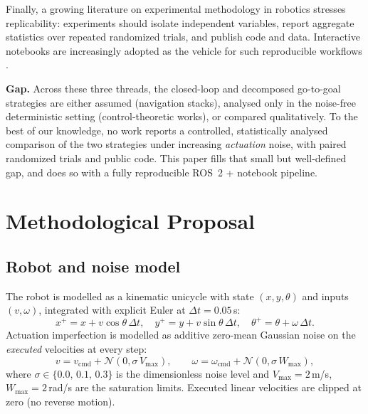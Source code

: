 \documentclass[conference]{IEEEtran}
\begin{document}
Finally, a growing literature on experimental methodology in robotics
\cite{bonsignorio2015toward,macenski2022ros2} stresses replicability:
experiments should isolate independent variables, report aggregate statistics
over repeated randomized trials, and publish code and data. Interactive
notebooks are increasingly adopted as the vehicle for such reproducible
workflows \cite{kluyver2016jupyter}.

\textbf{Gap.} Across these three threads, the closed-loop and decomposed
go-to-goal strategies are either assumed (navigation stacks), analysed only
in the noise-free deterministic setting (control-theoretic works), or
compared qualitatively. To the best of our knowledge, no work reports a
controlled, statistically analysed comparison of the two strategies under
increasing \emph{actuation} noise, with paired randomized trials and public
code. This paper fills that small but well-defined gap, and does so with a
fully reproducible ROS~2 + notebook pipeline.

\section{Methodological Proposal}
\subsection{Robot and noise model}
The robot is modelled as a kinematic unicycle with state $(x,y,\theta)$ and
inputs $(v,\omega)$, integrated with explicit Euler at $\Delta t=0.05$\,s:
\begin{equation}
x^+ = x + v\cos\theta\,\Delta t,\quad
y^+ = y + v\sin\theta\,\Delta t,\quad
\theta^+ = \theta + \omega\,\Delta t .
\end{equation}
Actuation imperfection is modelled as additive zero-mean Gaussian noise on the
\emph{executed} velocities at every step:
\begin{equation}
v = v_{\mathrm{cmd}} + \mathcal{N}(0,\sigma\,V_{\max}),\qquad
\omega = \omega_{\mathrm{cmd}} + \mathcal{N}(0,\sigma\,W_{\max}),
\end{equation}
where $\sigma\in\{0.0,\,0.1,\,0.3\}$ is the dimensionless noise level and
$V_{\max}=2$\,m/s, $W_{\max}=2$\,rad/s are the saturation limits. Executed
linear velocities are clipped at zero (no reverse motion).
\end{document}
